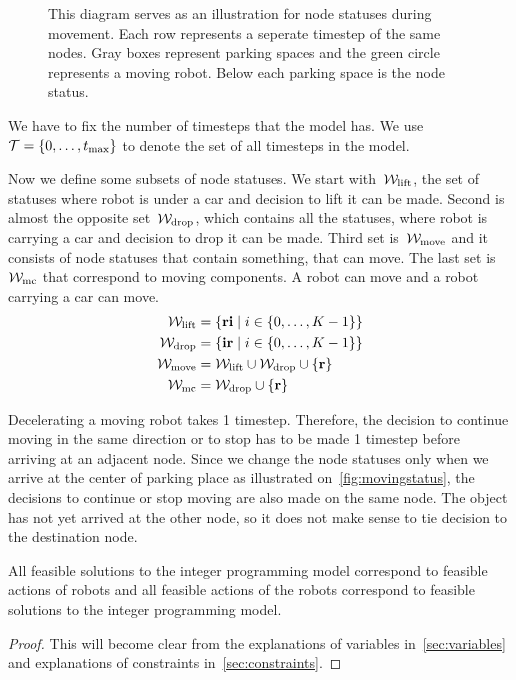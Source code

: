 \begin{figure}[h]
    \begin{center}
        
        \caption{This diagram serves as an illustration for node statuses
            during movement. Each row represents a seperate timestep of the
            same nodes. Gray boxes represent parking spaces and the green
            circle represents a moving robot. Below each parking space is the node
        status.}
        \label{fig:movingstatus}
    \end{center}
\end{figure}

We have to fix the number of timesteps that the model has. We use $\mathcal{T} =
\{0,\ldots,t_{\max}\}$ to denote the set of all timesteps in the model.

Now we define some subsets of node statuses. We start with~$\mathcal{W}_\mathrm{lift}$, the set of
statuses where robot is under a car and decision to lift it can be made. Second
is almost the opposite set~$\mathcal{W}_\mathrm{drop}$, which contains all the statuses, where robot
is carrying a car and decision to drop it can be made. Third set is~$\mathcal{W}_\mathrm{move}$ and
it consists of node statuses that contain something, that can move. The last
set is~$\mathcal{W}_\mathrm{mc}$ that correspond to moving components. A robot can move and a
robot carrying a car can move.
\begin{align}
    \mathcal{W}_\mathrm{lift} &= \{\text{\bf ri} \mid i \in \{0,\ldots,K-1\}\}\\
    \mathcal{W}_\mathrm{drop} &= \{\text{\bf ir} \mid i \in \{0,\ldots,K-1\}\}\\
    \mathcal{W}_\mathrm{move} &= \mathcal{W}_\mathrm{lift} \cup \mathcal{W}_\mathrm{drop} \cup \{\text{\bf r}\}\\
    \mathcal{W}_\mathrm{mc} &= \mathcal{W}_\mathrm{drop} \cup \{\text{\bf r}\}
\end{align}

Decelerating a moving robot takes 1 timestep. Therefore, the decision to continue
moving in the same direction or to stop has to be made 1 timestep before
arriving at an adjacent node. Since we change the node statuses only when we
arrive at the center of parking place as illustrated
on~\autoref{fig:movingstatus}, the decisions to continue or stop moving are
also made on the same node. The object has not yet arrived at the other node,
so it does not make sense to tie decision to the destination node.

\begin{proposition}
    All feasible solutions to the integer programming model correspond to feasible
    actions of robots and all feasible actions of the robots correspond to
    feasible solutions to the integer programming model.
\end{proposition}
\begin{proof}
    This will become clear from the explanations of variables
    in~\autoref{sec:variables} and explanations of constraints
    in~\autoref{sec:constraints}.
\end{proof}
